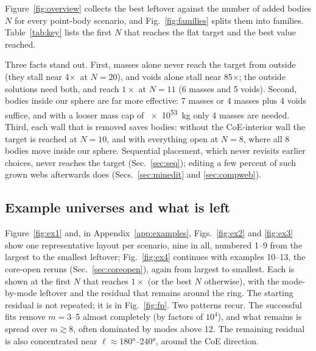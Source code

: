 \documentclass[aps,prd,twocolumn,nofootinbib,superscriptaddress,floatfix]{revtex4-2}
\newcommand{\fl}{\ensuremath{\times}}
\begin{document}
Figure~\ref{fig:overview} collects the best leftover against the number of added bodies $N$ for every point-body scenario, and Fig.~\ref{fig:families} splits them into families. Table~\ref{tab:key} lists the first $N$ that reaches the flat target and the best value reached.

Three facts stand out. First, masses alone never reach the target from outside (they stall near 4\fl\ at $N=20$), and voids alone stall near 85\fl; the outside solutions need both, and reach $1\times$ at $N=11$ (6 masses and 5 voids). Second, bodies inside our sphere are far more effective: 7 masses or 4 masses plus 4 voids suffice, and with a looser mass cap of \SI{e53}{\kilo\gram} only 4 masses are needed. Third, each wall that is removed saves bodies: without the CoE-interior wall the target is reached at $N=10$, and with everything open at $N=8$, where all 8 bodies move inside our sphere. Sequential placement, which never revisits earlier choices, never reaches the target (Sec.~\ref{sec:seq}); editing a few percent of such grown webs afterwards does (Secs.~\ref{sec:minedit} and \ref{sec:compweb}).

\subsection{Example universes and what is left}\label{sec:examples}
Figure~\ref{fig:ex1} and, in Appendix~\ref{app:examples}, Figs.~\ref{fig:ex2} and \ref{fig:ex3} show one representative layout per scenario, nine in all, numbered 1--9 from the largest to the smallest leftover; Fig.~\ref{fig:ex4} continues with examples 10--13, the core-open reruns (Sec.~\ref{sec:coreopen}), again from largest to smallest. Each is shown at the first $N$ that reaches $1\times$ (or the best $N$ otherwise), with the mode-by-mode leftover and the residual that remains around the ring. The starting residual is not repeated; it is in Fig.~\ref{fig:fp}. Two patterns recur. The successful fits remove $m=3$--5 almost completely (by factors of $10^4$), and what remains is spread over $m\gtrsim8$, often dominated by modes above 12. The remaining residual is also concentrated near $\ell\approx\ang{180}$--\ang{240}, around the CoE direction.
\end{document}
